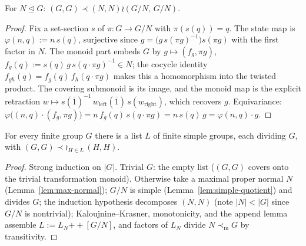 \begin{lemma}\label{lem:kaloujnine-krasner}
  \leanok
  For $N \trianglelefteq G$:
  $(G,G) \prec (N,N) \wr (G/N,\, G/N)$.
\end{lemma}
\begin{proof}
  \leanok
  Fix a set-section $s$ of $\pi : G \to G/N$ with $\pi(s(q)) = q$. The
  state map is $\varphi(n, q) := n\, s(q)$, surjective since
  $g = \big(g\, s(\pi g)^{-1}\big) s(\pi g)$ with the first factor in
  $N$. The monoid part embeds $G$ by
  $g \mapsto (f_g, \pi g)$, $f_g(q) := s(q)\, g\, s(q \cdot \pi g)^{-1}
  \in N$; the cocycle identity
  $f_{gh}(q) = f_g(q)\, f_h(q \cdot \pi g)$ makes this a homomorphism
  into the twisted product. The covering submonoid is its image, and
  the monoid map is the explicit retraction
  $w \mapsto s(\bar 1)^{-1}\, w_{\mathrm{left}}(\bar 1)\,
  s(w_{\mathrm{right}})$, which recovers $g$. Equivariance:
  $\varphi\big((n,q) \cdot (f_g, \pi g)\big)
  = n\, f_g(q)\, s(q \cdot \pi g)
  = n\, s(q)\, g = \varphi(n,q) \cdot g$.
\end{proof}

\begin{lemma}\label{lem:group-series}
  \leanok
  For every finite group $G$ there is a list $L$ of finite simple
  groups, each dividing $G$, with
  $(G,G) \prec \wr_{H \in L}\,(H,H)$.
\end{lemma}
\begin{proof}
  \leanok
  Strong induction on $|G|$. Trivial $G$: the empty list ($(G,G)$
  covers onto the trivial transformation monoid). Otherwise take a
  maximal proper normal $N$ (Lemma~\ref{lem:max-normal}); $G/N$ is
  simple (Lemma~\ref{lem:simple-quotient}) and divides $G$; the
  induction hypothesis decomposes $(N,N)$ (note $|N| < |G|$ since
  $G/N$ is nontrivial); Kaloujnine--Krasner, monotonicity, and the
  append lemma assemble $L := L_N \mathbin{+\!\!+} [G/N]$, and factors
  of $L_N$ divide $N \prec_{\mathrm m} G$ by transitivity.
\end{proof}

